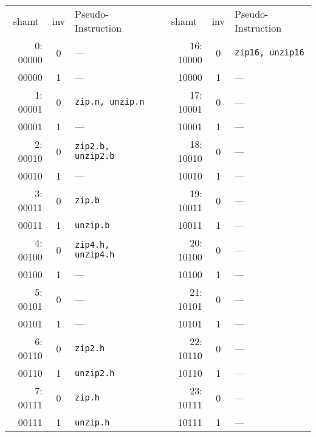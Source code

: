 \begin{table}[h]
\begin{small}
\begin{center}
\begin{tabular}{r c l p{1in} r c l}
\multicolumn{1}{c}{shamt} &
\multicolumn{1}{c}{inv} &
Pseudo-Instruction & &
\multicolumn{1}{c}{shamt} &
\multicolumn{1}{c}{inv} &
Pseudo-Instruction \\

\cline{1-3}
\cline{5-7}

 0: 00000 & 0 & ---                      &   &   16: 10000 & 0 & {\tt zip16, unzip16}    \\
    00000 & 1 & ---                      &   &       10000 & 1 & ---                     \\
 1: 00001 & 0 & {\tt zip.n, unzip.n}     &   &   17: 10001 & 0 & ---                     \\
    00001 & 1 & ---                      &   &       10001 & 1 & ---                     \\
 2: 00010 & 0 & {\tt zip2.b, unzip2.b}   &   &   18: 10010 & 0 & ---                     \\
    00010 & 1 & ---                      &   &       10010 & 1 & ---                     \\
 3: 00011 & 0 & {\tt zip.b}              &   &   19: 10011 & 0 & ---                     \\
    00011 & 1 & {\tt unzip.b}            &   &       10011 & 1 & ---                     \\

\cline{1-3}
\cline{5-7}

 4: 00100 & 0 & {\tt zip4.h, unzip4.h}   &   &   20: 10100 & 0 & ---                     \\
    00100 & 1 & ---                      &   &       10100 & 1 & ---                     \\
 5: 00101 & 0 & ---                      &   &   21: 10101 & 0 & ---                     \\
    00101 & 1 & ---                      &   &       10101 & 1 & ---                     \\
 6: 00110 & 0 & {\tt zip2.h}             &   &   22: 10110 & 0 & ---                     \\
    00110 & 1 & {\tt unzip2.h}           &   &       10110 & 1 & ---                     \\
 7: 00111 & 0 & {\tt zip.h}              &   &   23: 10111 & 0 & ---                     \\
    00111 & 1 & {\tt unzip.h}            &   &       10111 & 1 & ---                     \\


\end{tabular}
\end{center}
\end{small}
\end{table}
